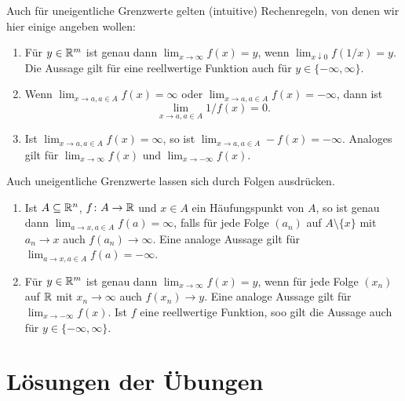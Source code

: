 \documentclass[a4paper,10pt]{article}
\begin{document}
Auch für uneigentliche Grenzwerte gelten (intuitive) Rechenregeln, von denen wir hier einige angeben wollen:
\begin{enumerate}
 \item
  Für $y \in \mathbb{R}^m$ ist genau dann $\lim_{x \to \infty} f(x) = y$, wenn $\lim_{x \downarrow 0} f(1/x) = y$. Die Aussage gilt für eine reellwertige Funktion auch für $y \in \{-\infty, \infty\}$.
 \item
  Wenn $\lim_{x \to a, a \in A} f(x) = \infty$ oder $\lim_{x \to a, a \in A} f(x) = -\infty$, dann ist
  \[
   \lim_{x \to a, a \in A} 1/f(x) = 0.
  \]
 \item
  Ist $\lim_{x \to a, a \in A} f(x) = \infty$, so ist $\lim_{x \to a, a \in A} -f(x) = -\infty$. Analoges gilt für $\lim_{x \to \infty} f(x)$ und $\lim_{x \to -\infty} f(x)$.
\end{enumerate}
Auch uneigentliche Grenzwerte lassen sich durch Folgen ausdrücken.
\begin{enumerate}
 \item
  Ist $A \subseteq \mathbb{R}^n$, $f \colon A \to \mathbb{R}$ und $x \in A$ ein Häufungspunkt von $A$, so ist genau dann $\lim_{a \to x, a \in A} f(a) = \infty$, falls für jede Folge $(a_n)$ auf $A \setminus \{x\}$ mit $a_n \to x$ auch $f(a_n) \to \infty$. Eine analoge Aussage gilt für $\lim_{a \to x, a \in A} f(a) = -\infty$.
 \item
  Für $y \in \mathbb{R}^m$ ist genau dann $\lim_{x \to \infty} f(x) = y$, wenn für jede Folge $(x_n)$ auf $\mathbb{R}$ mit $x_n \to \infty$ auch $f(x_n) \to y$. Eine analoge Aussage gilt für $\lim_{x \to -\infty} f(x)$. Ist $f$ eine reellwertige Funktion, soo gilt die Aussage auch für $y \in \{-\infty, \infty\}$.
\end{enumerate}









\newpage


\section{Lösungen der Übungen}


\printsolutions
\end{document}
